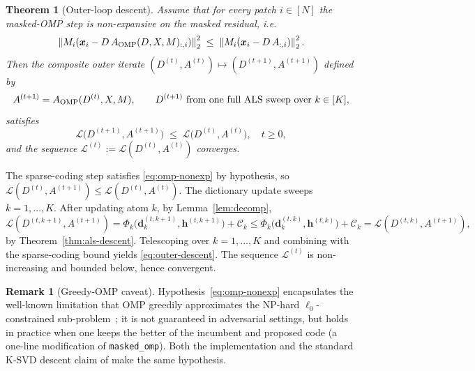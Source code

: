 \documentclass[journal,onecolumn,11pt]{IEEEtran}
\newtheorem{theorem}{Theorem}
\theoremstyle{definition}
\newtheorem{remark}{Remark}
\newcommand{\Loss}{\mathcal{L}}
\newcommand{\norm}[1]{\left\lVert #1 \right\rVert}
\newcommand{\dvec}{\bm{d}}
\newcommand{\hvec}{\bm{h}}
\newcommand{\xvec}{\bm{x}}
\begin{document}
\begin{theorem}[Outer-loop descent]
\label{thm:outer-descent}
Assume that for every patch $i\in[N]$ the masked-OMP step is
\emph{non-expansive on the masked residual}, i.e.\
\begin{equation}
\norm{M_i(\xvec_i-D\,A_{\rm OMP}(D,X,M)_{:,i})}_2^2
\;\le\;
\norm{M_i(\xvec_i-D\,A_{:,i})}_2^2.
\label{eq:omp-nonexp}
\end{equation}
Then the composite outer iterate
$(D^{(t)},A^{(t)})\mapsto(D^{(t+1)},A^{(t+1)})$ defined by
\begin{equation*}
A^{(t+1)} = A_{\rm OMP}(D^{(t)},X,M),\qquad
D^{(t+1)}\text{ from one full ALS sweep over }k\in[K],
\end{equation*}
satisfies
\begin{equation}
\Loss\bigl(D^{(t+1)},A^{(t+1)}\bigr)\;\le\;\Loss\bigl(D^{(t)},A^{(t)}\bigr),
\quad t\ge 0,
\label{eq:outer-descent}
\end{equation}
and the sequence $\Loss^{(t)}:=\Loss(D^{(t)},A^{(t)})$ converges.
\end{theorem}
\begin{IEEEproof}
The sparse-coding step satisfies \eqref{eq:omp-nonexp} by hypothesis,
so $\Loss(D^{(t)},A^{(t+1)})\le\Loss(D^{(t)},A^{(t)})$. The dictionary
update sweeps $k=1,\dots,K$. After updating atom $k$, by
Lemma~\ref{lem:decomp},
\[
\Loss(D^{(t,k+1)},A^{(t+1)})
=\Phi_k\bigl(\dvec_k^{(t,k+1)},\hvec^{(t,k+1)}\bigr)+\mathcal{C}_k
\le\Phi_k\bigl(\dvec_k^{(t,k)},\hvec^{(t,k)}\bigr)+\mathcal{C}_k
=\Loss(D^{(t,k)},A^{(t+1)}),
\]
by Theorem~\ref{thm:als-descent}. Telescoping over $k=1,\dots,K$ and
combining with the sparse-coding bound yields
\eqref{eq:outer-descent}. The sequence $\Loss^{(t)}$ is non-increasing
and bounded below, hence convergent.
\end{IEEEproof}

\begin{remark}[Greedy-OMP caveat]
\label{rmk:omp}
Hypothesis~\eqref{eq:omp-nonexp} encapsulates the well-known limitation
that OMP greedily approximates the NP-hard $\ell_0$-constrained
sub-problem~\cite{tropp2007omp}; it is not guaranteed in adversarial
settings, but holds in practice when one keeps the better of the
incumbent and proposed code (a one-line modification of
\texttt{masked\_omp}). Both the implementation and the standard K-SVD
descent claim of \cite{aharon2006ksvd} make the same hypothesis.
\end{remark}

\end{document}
